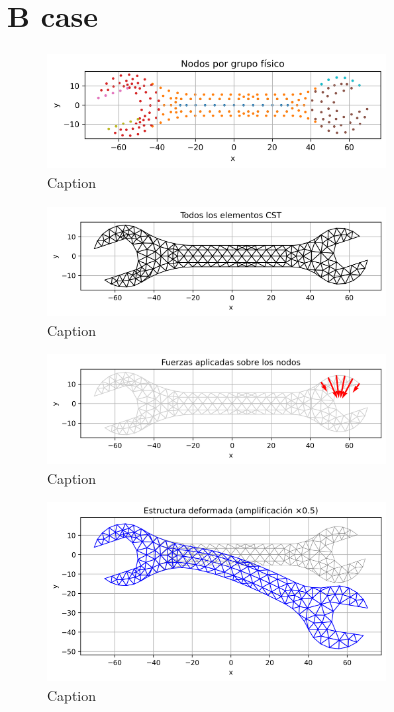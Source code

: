 \documentclass{article}  %
\begin{document}
\newpage
\section{B case}

\begin{figure}[H]
  \centering
  \includegraphics[width=0.8\textwidth]{GRAFICOS/Case b_nodes_por_grupo.png}
  \caption{Caption}
  \label{fig:wrench}
\end{figure}

\begin{figure}[H]
  \centering
  \includegraphics[width=0.8\textwidth]{GRAFICOS/Case b_elementos.png}
  \caption{Caption}
  \label{fig:deformed_shape}
\end{figure}

\begin{figure}[H]
  \centering
  \includegraphics[width=0.8\textwidth]{GRAFICOS/Case b_fuerzas.png}
  \caption{Caption}
  \label{fig:strain}
\end{figure}

\begin{figure}[H]
  \centering
  \includegraphics[width=0.8\textwidth]{GRAFICOS/Case b_deformada.png}
  \caption{Caption}
  \label{fig:stress}
\end{figure}
\end{document}
